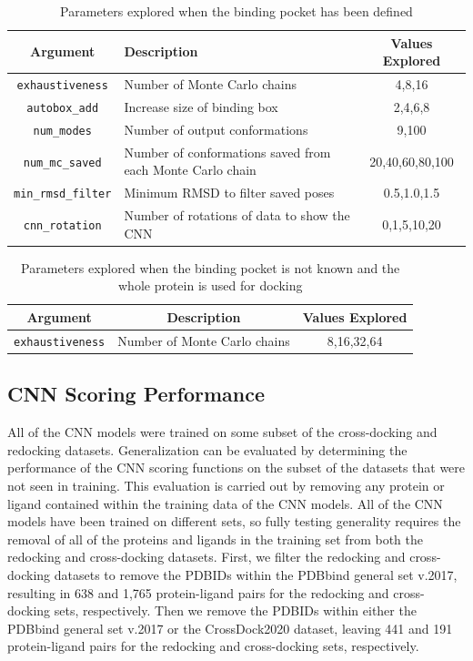 \documentclass[journal=jcisd8,manuscript=article]{achemso}
\begin{document}
\begin{table}[]
    \centering
    \begin{tabular}{|c|p{}|c|}
        \hline Argument & Description & Values Explored \\ \hline
         \texttt{exhaustiveness} & Number of Monte Carlo chains & 4,8,16 \\ \hline
         \texttt{autobox\_add} & Increase size of binding box & 2,4,6,8 \\ \hline
         \texttt{num\_modes} & Number of output conformations & 9,100 \\ \hline
         \texttt{num\_mc\_saved} & Number of conformations saved from each Monte Carlo chain & 20,40,60,80,100 \\ \hline
         \texttt{min\_rmsd\_filter} & Minimum RMSD to filter saved poses & 0.5,1.0,1.5 \\ \hline
         \texttt{cnn\_rotation} & Number of rotations of data to show the CNN & 0,1,5,10,20 \\ \hline
    \end{tabular}
    \caption{Parameters explored when the binding pocket has been defined}
    \label{tab:SettingsExplPocket}
\end{table}

\begin{table}[]
    \centering
    \begin{tabular}{|c|c|c|}
        \hline Argument & Description & Values Explored \\ \hline
         \texttt{exhaustiveness} & Number of Monte Carlo chains & 8,16,32,64 \\ \hline
    \end{tabular}
    \caption{Parameters explored when the binding pocket is not known and the whole protein is used for docking}
    \label{tab:SettingsExplWP}
\end{table}

\subsection{CNN Scoring Performance}
All of the CNN models were trained on some subset of the cross-docking and redocking datasets. Generalization can be evaluated by determining the performance of the CNN scoring functions on the subset of the datasets that were not seen in training. This evaluation is carried out by removing any protein or ligand contained within the training data of the CNN models. All of the CNN models have been trained on different sets, so fully testing generality requires the removal of all of the proteins and ligands in the training set from both the redocking and cross-docking datasets. First, we filter the redocking and cross-docking datasets to remove the PDBIDs within the PDBbind general set v.2017, resulting in 638 and 1,765 protein-ligand pairs for the redocking and cross-docking sets, respectively. Then we remove the PDBIDs within either the PDBbind general set v.2017\cite{liu2017forging} or the CrossDock2020 dataset\cite{francoeur2020three}, leaving 441 and 191 protein-ligand pairs for the redocking and cross-docking sets, respectively. 
\end{document}
